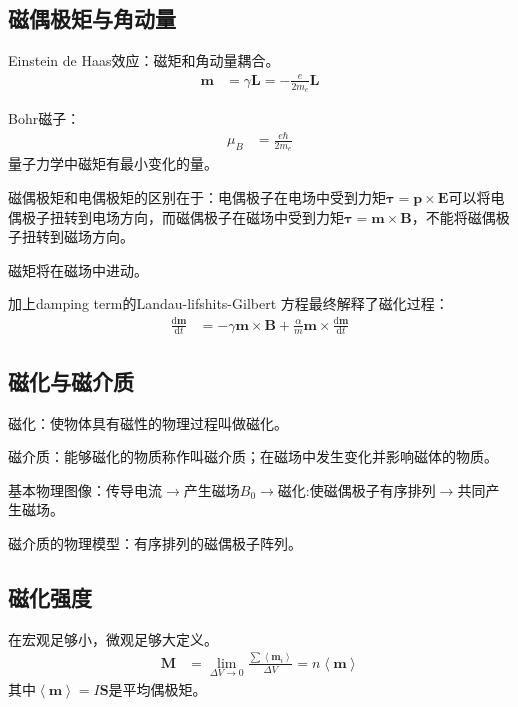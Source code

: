 \documentclass[12pt,onecolumn,a4paper]{book}
\numberwithin{table}{subsection}
\numberwithin{equation}{subsection}
\begin{document}
\subsection{磁偶极矩与角动量}

Einstein de Haas效应：磁矩和角动量耦合。
\begin{align}
    \mathbf{m} & = \gamma \mathbf{L} = - \frac{e}{2m_e} \mathbf{L}
\end{align}

Bohr磁子：
\begin{align}
    \mu_B & = \frac{e\hbar}{2m_e}
\end{align}
量子力学中磁矩有最小变化的量。

磁偶极矩和电偶极矩的区别在于：电偶极子在电场中受到力矩$\mathbf{\tau} = \mathbf{p} \times \mathbf{E}$可以将电偶极子扭转到电场方向，而磁偶极子在磁场中受到力矩$\mathbf{\tau} = \mathbf{m} \times \mathbf{B}$，不能将磁偶极子扭转到磁场方向。

磁矩将在磁场中进动。

加上damping term的Landau-lifshits-Gilbert 方程最终解释了磁化过程：
\begin{align}
    \frac{\mathrm{d} \mathbf{m}}{\mathrm{d} t} & = -\gamma \mathbf{m} \times \mathbf{B} + \frac{\alpha }{m}\mathbf{m} \times \frac{\mathrm{d} \mathbf{m}}{\mathrm{d} t}
\end{align}

\subsection{磁化与磁介质}

磁化：使物体具有磁性的物理过程叫做磁化。

磁介质：能够磁化的物质称作叫磁介质；在磁场中发生变化并影响磁体的物质。

基本物理图像：传导电流$\rightarrow$产生磁场$B_0$$\rightarrow$磁化:使磁偶极子有序排列$\rightarrow$共同产生磁场。


    磁介质的物理模型：有序排列的磁偶极子阵列。

    \subsection{磁化强度}

    在宏观足够小，微观足够大定义。
    \begin{align}
        \mathbf{M} & = \lim_{\Delta V \rightarrow 0} \frac{\sum\left\langle \mathbf{m}_i \right\rangle}{\Delta V} = n \left\langle \mathbf{m} \right\rangle
    \end{align}
    其中$\left\langle \mathbf{m} \right\rangle = I \mathbf{S}$是平均偶极矩。
\end{document}
